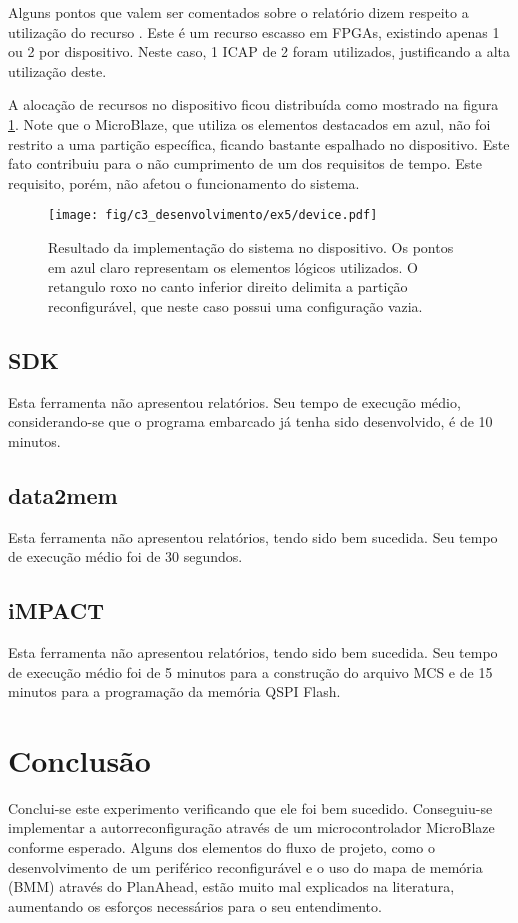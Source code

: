 \documentclass[11pt,a4paper,oneside]{book}
\begin{document}
Alguns pontos que valem ser comentados sobre o relatório dizem respeito a utilização do recurso .
Este é um recurso escasso em FPGAs, existindo apenas 1 ou 2 por dispositivo.
Neste caso, 1 ICAP de 2 foram utilizados, justificando a alta utilização deste.
 
A alocação de recursos no dispositivo ficou distribuída como mostrado na figura \ref{fig:ex5:device}.
Note que o MicroBlaze, que utiliza os elementos destacados em azul, não foi restrito a uma partição específica, ficando bastante espalhado no dispositivo.
Este fato contribuiu para o não cumprimento de um dos requisitos de tempo.
Este requisito, porém, não afetou o funcionamento do sistema.

\begin{figure}[htp]
\centering
\texttt{[image: fig/c3\_desenvolvimento/ex5/device.pdf]}
\caption{Resultado da implementação do sistema no dispositivo. Os pontos em azul claro representam os elementos lógicos utilizados. O retangulo roxo no canto inferior direito delimita a partição reconfigurável, que neste caso possui uma configuração vazia.}
\label{fig:ex5:device}
\end{figure}

\subsection{SDK}
Esta ferramenta não apresentou relatórios.
Seu tempo de execução médio, considerando-se que o programa embarcado já tenha sido desenvolvido, é de 10 minutos.

\subsection{data2mem}
Esta ferramenta não apresentou relatórios, tendo sido bem sucedida.
Seu tempo de execução médio foi de 30 segundos.

\subsection{iMPACT}
Esta ferramenta não apresentou relatórios, tendo sido bem sucedida.
Seu tempo de execução médio foi de 5 minutos para a construção do arquivo MCS e de 15 minutos para a programação da memória QSPI Flash.

\section{Conclusão}
Conclui-se este experimento verificando que ele foi bem sucedido.
Conseguiu-se implementar a autorreconfiguração através de um microcontrolador MicroBlaze conforme esperado.
Alguns dos elementos do fluxo de projeto, como o desenvolvimento de um periférico reconfigurável e o uso do mapa de memória (BMM) através do PlanAhead, estão muito mal explicados na literatura, aumentando os esforços necessários para o seu entendimento.
\end{document}

